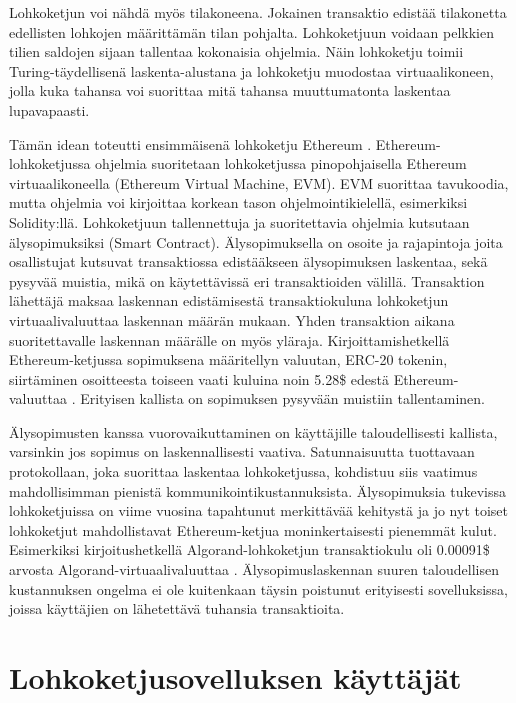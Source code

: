 Lohkoketjun voi nähdä myös tilakoneena. Jokainen transaktio edistää tilakonetta edellisten lohkojen määrittämän tilan pohjalta. Lohkoketjuun voidaan pelkkien tilien saldojen sijaan tallentaa kokonaisia ohjelmia. Näin lohkoketju toimii Turing-täydellisenä laskenta-alustana ja lohkoketju muodostaa virtuaalikoneen, jolla kuka tahansa voi suorittaa mitä tahansa muuttumatonta laskentaa lupavapaasti.

Tämän idean toteutti ensimmäisenä lohkoketju Ethereum \cite{buterin_ethereum_2014}. Ethereum-lohkoketjussa ohjelmia suoritetaan lohkoketjussa pinopohjaisella Ethereum virtuaalikoneella (Ethereum Virtual Machine, EVM). EVM suorittaa tavukoodia, mutta ohjelmia voi kirjoittaa korkean tason ohjelmointikielellä, esimerkiksi Solidity:llä. Lohkoketjuun tallennettuja ja suoritettavia ohjelmia kutsutaan älysopimuksiksi (Smart Contract).  Älysopimuksella on osoite ja rajapintoja joita osallistujat kutsuvat transaktiossa edistääkseen älysopimuksen laskentaa, sekä pysyvää muistia, mikä on käytettävissä eri transaktioiden välillä. Transaktion lähettäjä maksaa laskennan edistämisestä transaktiokuluna lohkoketjun virtuaalivaluuttaa laskennan määrän mukaan. Yhden transaktion aikana suoritettavalle laskennan määrälle on myös yläraja. Kirjoittamishetkellä Ethereum-ketjussa sopimuksena määritellyn valuutan, ERC-20 tokenin, siirtäminen osoitteesta toiseen vaati kuluina noin 5.28\$ edestä Ethereum-valuuttaa \cite{etherscanio_ethereum_nodate}. Erityisen kallista on sopimuksen pysyvään muistiin tallentaminen.

Älysopimusten kanssa vuorovaikuttaminen on käyttäjille taloudellisesti kallista, varsinkin jos sopimus on laskennallisesti vaativa. Satunnaisuutta tuottavaan protokollaan, joka suorittaa laskentaa lohkoketjussa, kohdistuu siis vaatimus mahdollisimman pienistä kommunikointikustannuksista. Älysopimuksia tukevissa lohkoketjuissa on viime vuosina tapahtunut merkittävää kehitystä ja jo nyt toiset lohkoketjut mahdollistavat Ethereum-ketjua moninkertaisesti pienemmät kulut. Esimerkiksi kirjoitushetkellä Algorand-lohkoketjun transaktiokulu oli 0.00091\$ arvosta Algorand-virtuaalivaluuttaa \cite{noauthor_algorand_nodate}. Älysopimuslaskennan suuren taloudellisen kustannuksen ongelma ei ole kuitenkaan täysin poistunut erityisesti sovelluksissa, joissa käyttäjien on lähetettävä tuhansia transaktioita.

\section{Lohkoketjusovelluksen käyttäjät}

